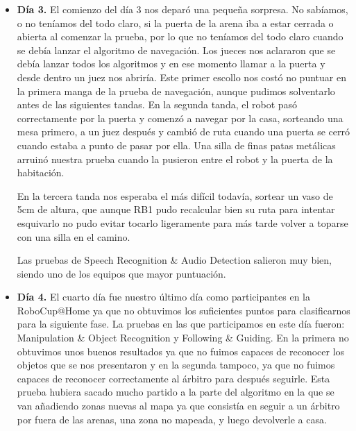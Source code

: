 \begin{itemize}
\item \textbf{Día 3.} El comienzo del día 3 nos deparó una pequeña sorpresa. No sabíamos, o no teníamos del todo claro, si la puerta de la arena iba a estar cerrada o abierta al comenzar la prueba, por lo que no teníamos del todo claro cuando se debía lanzar el algoritmo de navegación. Los jueces nos aclararon que se debía lanzar todos los algoritmos y en ese momento llamar a la puerta y desde dentro un juez nos abriría. Este primer escollo nos costó no puntuar en la primera manga de la prueba de navegación, aunque pudimos solventarlo antes de las siguientes tandas. En la segunda tanda, el robot pasó correctamente por la puerta y comenzó a navegar por la casa, sorteando una mesa primero, a un juez después y cambió de ruta cuando una puerta se cerró cuando estaba a punto de pasar por ella. Una silla de finas patas metálicas arruinó nuestra prueba cuando la pusieron entre el robot y la puerta de la habitación. 

En la tercera tanda nos esperaba el más difícil todavía, sortear un vaso de 5cm de altura, que aunque RB1 pudo recalcular bien su ruta para intentar esquivarlo no pudo evitar tocarlo ligeramente para más tarde volver a toparse con una silla en el camino. 

Las pruebas de Speech Recognition \& Audio Detection salieron muy bien, siendo uno de los equipos que mayor puntuación.

\item \textbf{Día 4.} El cuarto día fue nuestro último día como participantes en la RoboCup@Home ya que no obtuvimos los suficientes puntos para clasificarnos para la siguiente fase. La pruebas en las que participamos en este día fueron: Manipulation \& Object Recognition y Following \& Guiding. En la primera no obtuvimos unos buenos resultados ya que no fuimos capaces de reconocer los objetos que se nos presentaron y en la segunda tampoco, ya que no fuimos capaces de reconocer correctamente al árbitro para después seguirle. Esta prueba hubiera sacado mucho partido a la parte del algoritmo en la que se van añadiendo zonas nuevas al mapa ya que consistía en seguir a un árbitro por fuera de las arenas, una zona no mapeada, y luego devolverle a casa.
\end{itemize}


